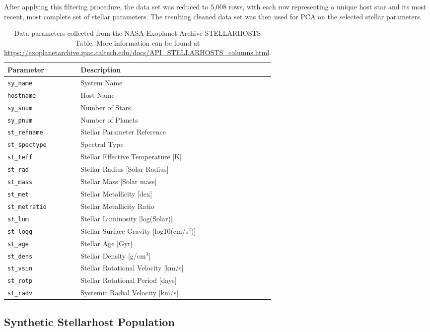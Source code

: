 \documentclass[preprint,longauthor,twocolumn]{aastex631}
\begin{document}
After applying this filtering procedure, the data set was reduced to 5,008 rows, with each row representing a unique host star and its most recent, most complete set of stellar parameters. The resulting cleaned data set was then used for PCA on the selected stellar parameters.
\begin{table}
  \centering
  \begin{tabular}{ll}
    \hline
    \textbf{Parameter} & \textbf{Description} \\
    \hline
    \verb|sy_name| & System Name \\
    \verb|hostname| & Host Name \\
    \verb|sy_snum| & Number of Stars \\
    \verb|sy_pnum| & Number of Planets \\
    \verb|st_refname| & Stellar Parameter Reference \\
    \verb|st_spectype| & Spectral Type \\
    \verb|st_teff| & Stellar Effective Temperature [K] \\
    \verb|st_rad| & Stellar Radius [Solar Radius] \\
    \verb|st_mass| & Stellar Mass [Solar mass] \\
    \verb|st_met| & Stellar Metallicity [dex] \\
    \verb|st_metratio| & Stellar Metallicity Ratio \\
    \verb|st_lum| & Stellar Luminosity [log(Solar)] \\
    \verb|st_logg| & Stellar Surface Gravity [log10(cm/s$^2$)] \\
    \verb|st_age| & Stellar Age [Gyr] \\
    \verb|st_dens| & Stellar Density [g/cm$^3$] \\
    \verb|st_vsin| & Stellar Rotational Velocity [km/s] \\
    \verb|st_rotp| & Stellar Rotational Period [days] \\
    \verb|st_radv| & Systemic Radial Velocity [km/s] \\
    \hline
  \end{tabular}
  \caption{Data parameters collected from the NASA Exoplanet Archive STELLARHOSTS Table. More information can be found at \url{https://exoplanetarchive.ipac.caltech.edu/docs/API_STELLARHOSTS_columns.html}.}
  \label{tab:data_parameters}
\end{table}

\subsection{Synthetic Stellarhost Population}
\end{document}
